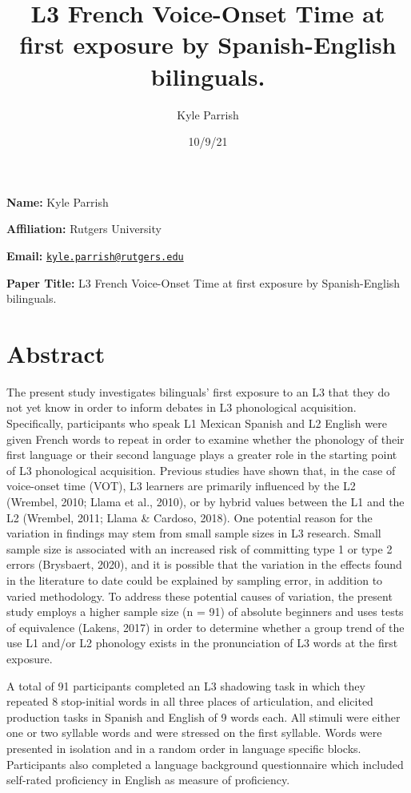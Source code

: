 \documentclass[
  12pt,
]{article}
\title{L3 French Voice-Onset Time at first exposure by Spanish-English
bilinguals.}
\author{Kyle Parrish}
\date{10/9/21}
\begin{document}
\maketitle

\textbf{Name:} Kyle Parrish

\textbf{Affiliation:} Rutgers University

\textbf{Email:}
\href{mailto:kyle.parrish@rutgers.edu}{\nolinkurl{kyle.parrish@rutgers.edu}}

\textbf{Paper Title:} L3 French Voice-Onset Time at first exposure by
Spanish-English bilinguals.

\newpage

\hypertarget{abstract}{%
\section{Abstract}\label{abstract}}

The present study investigates bilinguals' first exposure to an L3 that
they do not yet know in order to inform debates in L3 phonological
acquisition. Specifically, participants who speak L1 Mexican Spanish and
L2 English were given French words to repeat in order to examine whether
the phonology of their first language or their second language plays a
greater role in the starting point of L3 phonological acquisition.
Previous studies have shown that, in the case of voice-onset time (VOT),
L3 learners are primarily influenced by the L2 (Wrembel, 2010; Llama et
al., 2010), or by hybrid values between the L1 and the L2 (Wrembel,
2011; Llama \& Cardoso, 2018). One potential reason for the variation in
findings may stem from small sample sizes in L3 research. Small sample
size is associated with an increased risk of committing type 1 or type 2
errors (Brysbaert, 2020), and it is possible that the variation in the
effects found in the literature to date could be explained by sampling
error, in addition to varied methodology. To address these potential
causes of variation, the present study employs a higher sample size (n =
91) of absolute beginners and uses tests of equivalence (Lakens, 2017)
in order to determine whether a group trend of the use L1 and/or L2
phonology exists in the pronunciation of L3 words at the first exposure.

A total of 91 participants completed an L3 shadowing task in which they
repeated 8 stop-initial words in all three places of articulation, and
elicited production tasks in Spanish and English of 9 words each. All
stimuli were either one or two syllable words and were stressed on the
first syllable. Words were presented in isolation and in a random order
in language specific blocks. Participants also completed a language
background questionnaire which included self-rated proficiency in
English as measure of proficiency.
\end{document}

